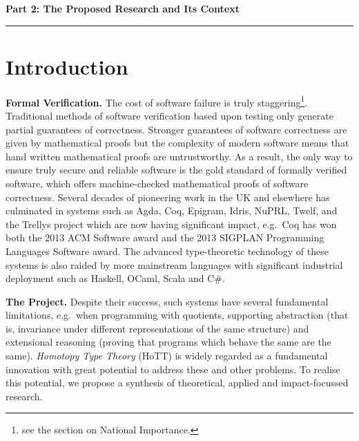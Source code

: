 \documentclass[a4paper,11pt]{article}
\newcommand{\eg}{{e.g.}\ }
\begin{document}
\newpage

\noindent
{\bf \Large Part 2: The Proposed Research and Its Context}

\vspace*{-0.23in}

\begin{center}
\rule{170mm}{.5mm}
\end{center}

\vspace*{-0.4in}

\section{Introduction}\label{sec:intro}

\vspace*{-0.1in}

{\bf Formal Verification.} The cost of software failure is truly
staggering\footnote{see the section on National
  Importance.}. Traditional methods of software verification based
upon testing only generate partial guarantees of correctness. Stronger
guarantees of software correctness are given by mathematical proofs
but the complexity of modern software means that hand written
mathematical proofs are untrustworthy. As a result, the only way to
ensure truly secure and reliable software is the gold standard of
formally verified software, which offers machine-checked mathematical
proofs of software correctness. Several decades of pioneering work in
the UK and elsewhere has culminated in systems 
such as Agda, Coq, Epigram, Idris, NuPRL, Twelf, and
the Trellys project which are now having significant impact,
\eg Coq has won both the 2013 ACM Software award and the 2013 SIGPLAN
Programming Languages Software award. The advanced type-theoretic
technology of these systems is also raided by more mainstream languages
with significant industrial deployment such as Haskell, OCaml, Scala
and C\#.


{\bf The Project.} Despite their success, such systems have several
fundamental limitations, \eg when programming with quotients,
supporting abstraction (that is, invariance under different
representations of the same structure) and extensional reasoning
(proving that programs which behave the same are the same).  {\em
  Homotopy Type Theory} (HoTT) is widely regarded as a fundamental
innovation with great potential to address these and other problems.
To realise this potential, we propose a synthesis of
theoretical, applied and impact-focussed research.
\end{document}
